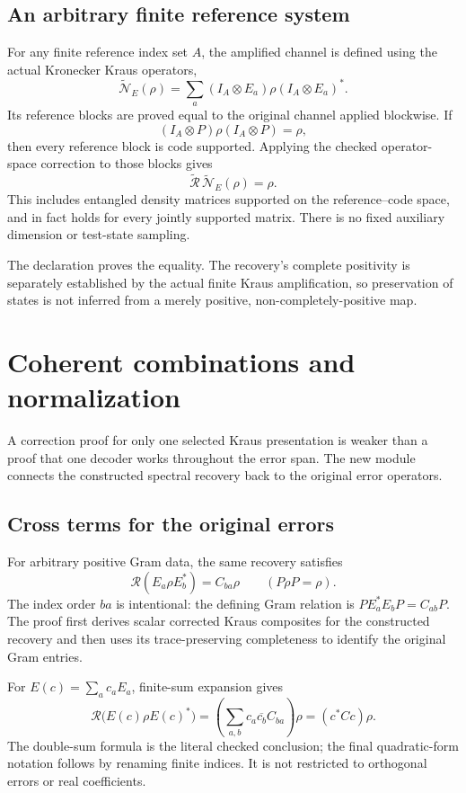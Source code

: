 \subsection{An arbitrary finite reference system}
For any finite reference index set $A$, the amplified channel is defined using the actual Kronecker Kraus operators,
\[
\widetilde{\mathcal N}_E(\rho)
=\sum_a(I_A\otimes E_a)\rho(I_A\otimes E_a)^*.
\]
Its reference blocks are proved equal to the original channel applied blockwise. If
\[
(I_A\otimes P)\rho(I_A\otimes P)=\rho,
\]
then every reference block is code supported. Applying the checked operator-space correction to those blocks gives
\[
\boxed{\widetilde{\mathcal R}\,\widetilde{\mathcal N}_E(\rho)=\rho.}
\]
This includes entangled density matrices supported on the reference--code space, and in fact holds for every jointly supported matrix. There is no fixed auxiliary dimension or test-state sampling.

The declaration  proves the equality. The recovery's complete positivity is separately established by the actual finite Kraus amplification, so preservation of states is not inferred from a merely positive, non-completely-positive map.



\section{Coherent combinations and normalization}\label{supp5:section:005}
A correction proof for only one selected Kraus presentation is weaker than a proof that one decoder works throughout the error span. The new module connects the constructed spectral recovery back to the original error operators.

\subsection{Cross terms for the original errors}
For arbitrary positive Gram data, the same recovery satisfies
\[
\boxed{\mathcal R(E_a\rho E_b^*)=C_{ba}\rho\qquad(P\rho P=\rho).}
\]
The index order $ba$ is intentional: the defining Gram relation is $PE_a^*E_bP=C_{ab}P$. The proof first derives scalar corrected Kraus composites for the constructed recovery and then uses its trace-preserving completeness to identify the original Gram entries.

For $E(c)=\sum_a c_aE_a$, finite-sum expansion gives
\[
\mathcal R\bigl(E(c)\rho E(c)^*\bigr)
=\left(\sum_{a,b}c_a\overline{c_b}C_{ba}\right)\rho
=(c^*Cc)\rho.
\]
The double-sum formula is the literal checked conclusion; the final quadratic-form notation follows by renaming finite indices. It is not restricted to orthogonal errors or real coefficients.

